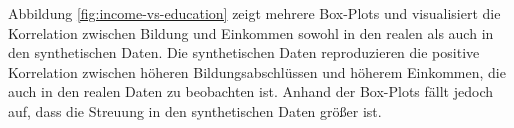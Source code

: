 \begin{spacing}{1.5}
Abbildung \ref{fig:income-vs-education} zeigt mehrere Box-Plots und visualisiert die Korrelation zwischen Bildung und Einkommen sowohl in den realen als auch in den synthetischen Daten. Die synthetischen Daten reproduzieren die positive Korrelation zwischen höheren Bildungsabschlüssen und höherem Einkommen, die auch in den realen Daten zu beobachten ist. Anhand der Box-Plots fällt jedoch auf, dass die Streuung in den synthetischen Daten größer ist.

\end{spacing}